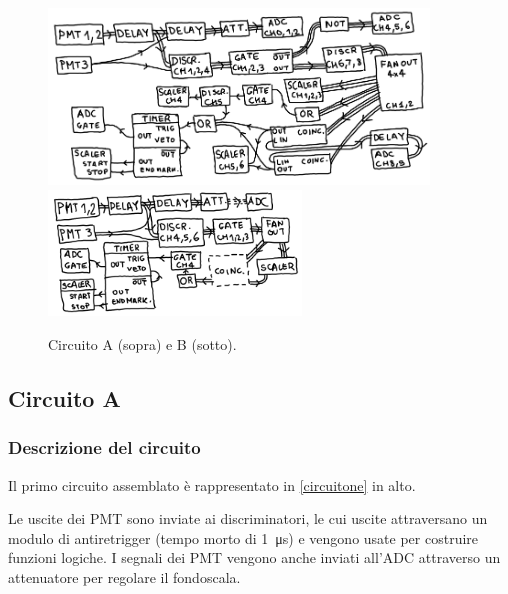 \begin{figure}
	\centering
	\includegraphics[width=0.9\textwidth]{immagini/circuitone} \\
	\vspace{1em}
	\includegraphics[width=0.6\textwidth]{immagini/circuitob}
	\caption{Circuito A (sopra) e B (sotto).}
	\label{circuitone}
\end{figure}

\subsection{Circuito A}

\subsubsection{Descrizione del circuito}

Il primo circuito assemblato è rappresentato in \autoref{circuitone} in alto.

Le uscite dei PMT sono inviate ai discriminatori, le cui uscite attraversano un modulo di antiretrigger (tempo morto di \SI{1}{\micro s}) e vengono usate per costruire funzioni logiche. I segnali dei PMT vengono anche inviati all'ADC attraverso un attenuatore per regolare il fondoscala.

